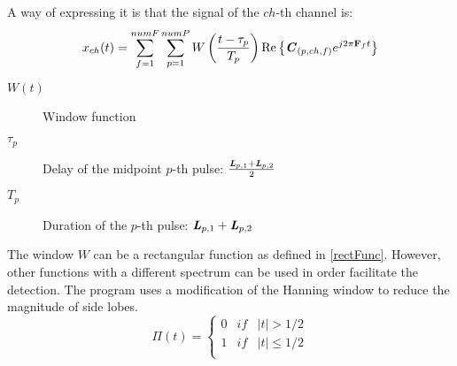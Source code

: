 A way of expressing it is that the signal of the $ch$-th channel is:
\begin{equation}
x_{ch}(t) = \sum_{f = 1}^{numF} \sum_{p = 1}^{numP} W\left(\frac{t - \tau_p}{T_p}\right)
\Re \left\{ \bm{\mathit{C}}_{(p,ch,f)} e^{j 2 \pi \mathbf{F}_f t} \right\}
\end{equation}

\begin{description}
	\item[$W(t)$] Window function
	\item[$\tau_p$] Delay of the midpoint $p$-th pulse: $\frac{\bm{\mathit{L}}_{p, 1} + \bm{\mathit{L}}_{p, 2}}{2}$
	\item[$T_p$] Duration of the $p$-th pulse: $\bm{\mathit{L}}_{p, 1} + \bm{\mathit{L}}_{p, 2}$
\end{description}


The window $W$ can be a rectangular function as defined in \autoref{rectFunc}. However, other functions with a different spectrum can be used in order facilitate the detection. The program uses a modification of the Hanning window to reduce the magnitude of side lobes. %
\begin{equation}
\Pi(t) = \left\{ \begin{array}{lcc}
0 &   if  & |t| > 1/2 \\
1 &  if & |t| \leq 1/2 \\
\end{array} \right.
\label{rectFunc}
\end{equation}


